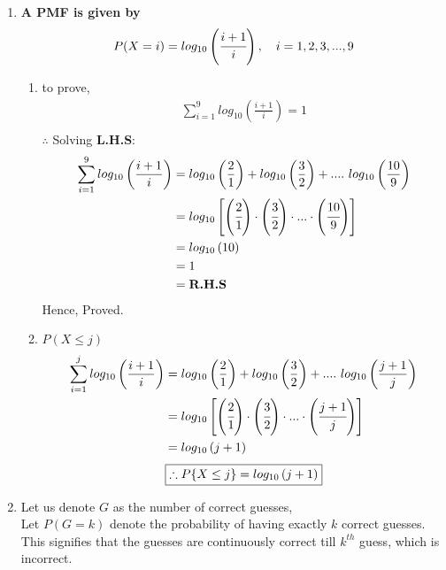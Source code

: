 \documentclass{article}
\begin{document}
\begin{enumerate}
\newpage
\item \textbf{A PMF is given by}\\
  \begin{align*}
    P(X={i}) = log_{10} \left(\cfrac{i + 1}{i}\right), \ \ \ i = 1, 2, 3,..., 9
  \end{align*}
  \begin{enumerate}
    \item to prove,
    \begin{align*}
      \sum_{i=1}^{9} log_{10}\left(\frac{i + 1}{i}\right) = 1\\
    \end{align*}
    $\therefore$ Solving \textbf{L.H.S}:
    \begin{align*}
      \sum_{i=1}^{9} log_{10}\left(\frac{i + 1}{i}\right) &= log_{10}\left(\frac{2}{1}\right) + log_{10}\left(\frac{3}{2}\right) + ....\ log_{10}\left(\frac{10}{9}\right)\\
      &= log_{10}\left[\left(\cfrac{2}{1}\right)\cdot\left(\cfrac{3}{2}\right)\cdot ...\cdot\left(\cfrac{10}{9}\right)\right]\\
      &= log_{10}\left(10\right)\\
      &= 1\\
      &= \textbf{R.H.S}
    \end{align*}
    Hence, Proved.\\
    \item $P(X \leq j) $
    \begin{align*}
      \sum_{i=1}^{j} log_{10}\left(\frac{i + 1}{i}\right) &= log_{10}\left(\frac{2}{1}\right) + log_{10}\left(\frac{3}{2}\right) + ....\ log_{10}\left(\frac{j + 1}{j}\right)\\
      &= log_{10}\left[\left(\cfrac{2}{1}\right)\cdot\left(\cfrac{3}{2}\right)\cdot ...\cdot\left(\cfrac{j + 1}{j}\right)\right]\\
      &= log_{10}\left(j + 1\right)\\
    \end{align*}
    \[
     \boxed{\therefore P\{X \leq j\} = log_{10}\left(j + 1\right)}\\
    \]
  \end{enumerate}
\newpage
\item
  Let us denote \(G\) as the number of correct guesses,\\
  Let \(P(G=k)\) denote the probability of having exactly \(k\) correct guesses.\\
  This signifies that the guesses are continuously correct till \(k^{th}\) guess, which is incorrect.\\

\end{enumerate}
\end{document}
